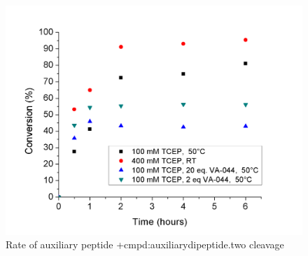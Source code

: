 \begin{figure}
    \includegraphics[max width=\linewidth]{meocleavage.png}
    \caption{Rate of auxiliary peptide \cmpd+{cmpd:auxiliarydipeptide.two} cleavage}
    \label{fig:meocleavagerate}
\end{figure}

